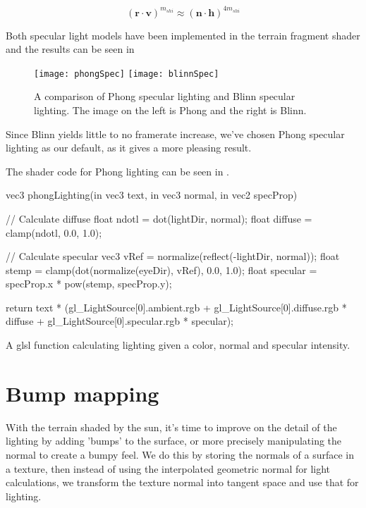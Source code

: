 \begin{displaymath}
  (\mathbf{r} \cdot \mathbf{v})^{m_{shi}} \approx (\mathbf{n} \cdot \mathbf{h})^{4m_{shi}} 
\end{displaymath}

Both specular light models have been implemented in the terrain
fragment shader and the results can be seen in 

\begin{figure}
  \label{fig:specularLight}
  \centering
  \texttt{[image: phongSpec]}
  \texttt{[image: blinnSpec]}
  \caption{A comparison of Phong specular lighting and Blinn specular lighting. The image on the left is Phong and the right is Blinn.}
\end{figure}

Since Blinn yields little to no framerate increase, we've chosen Phong
specular lighting as our default, as it gives a more pleasing result.

The shader code for Phong lighting can be seen in .

\begin{listing}
\label{lst:phongLighting}
\centering
\begin{cppcode}
vec3 phongLighting(in vec3 text, in vec3 normal, in vec2 specProp){
  // Calculate diffuse
  float ndotl = dot(lightDir, normal);
  float diffuse = clamp(ndotl, 0.0, 1.0);
  
  // Calculate specular
  vec3 vRef = normalize(reflect(-lightDir, normal));
  float stemp = clamp(dot(normalize(eyeDir), vRef), 0.0, 1.0);
  float specular = specProp.x * pow(stemp, specProp.y);
  
  return text * (gl_LightSource[0].ambient.rgb + 
                 gl_LightSource[0].diffuse.rgb * diffuse + 
                 gl_LightSource[0].specular.rgb * specular);
}
\end{cppcode}
\caption{A glsl function calculating lighting given a color, normal and specular intensity.}
\end{listing}


\section{Bump mapping}

With the terrain shaded by the sun, it's time to improve on the detail
of the lighting by adding 'bumps' to the surface, or more precisely
manipulating the normal to create a bumpy feel. We do this by storing
the normals of a surface in a texture, then instead of using the
interpolated geometric normal for light calculations, we transform the
texture normal into tangent space and use that for lighting.

